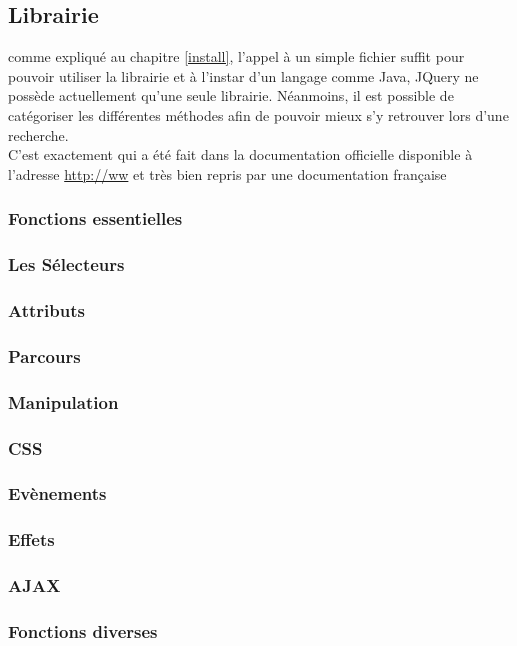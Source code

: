 \documentclass[10pt,a4paper,titlepage]{article}
\begin{document}
\subsection{Librairie}
comme expliqué au chapitre \ref{install}, l'appel à un simple fichier suffit pour pouvoir utiliser la librairie et à l'instar d'un langage comme Java, JQuery ne possède actuellement qu'une seule librairie. Néanmoins, il est possible de catégoriser les différentes méthodes afin de pouvoir mieux s'y retrouver lors d'une recherche.\\

C'est exactement qui a été fait dans la documentation officielle disponible à l'adresse \url{http://ww} et très bien repris par une documentation française

\subsubsection{Fonctions essentielles}
\subsubsection{Les Sélecteurs}
\subsubsection{Attributs}
\subsubsection{Parcours}
\subsubsection{Manipulation}
\subsubsection{CSS}
\subsubsection{Evènements}
\subsubsection{Effets}
\subsubsection{AJAX}
\subsubsection{Fonctions diverses}
\end{document}
